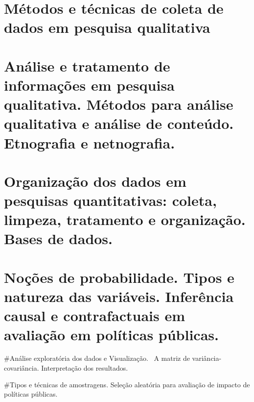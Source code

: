 \documentclass[
]{book}
\begin{document}
\hypertarget{muxe9todos-e-tuxe9cnicas-de-coleta-de-dados-em-pesquisa-qualitativa}{%
\chapter{Métodos e técnicas de coleta de dados em pesquisa qualitativa}\label{muxe9todos-e-tuxe9cnicas-de-coleta-de-dados-em-pesquisa-qualitativa}}

\hypertarget{anuxe1lise-e-tratamento-de-informauxe7uxf5es-em-pesquisa-qualitativa.-muxe9todos-para-anuxe1lise-qualitativa-e-anuxe1lise-de-conteuxfado.-etnografia-e-netnografia.}{%
\chapter{Análise e tratamento de informações em pesquisa qualitativa. Métodos para análise qualitativa e análise de conteúdo. Etnografia e netnografia.}\label{anuxe1lise-e-tratamento-de-informauxe7uxf5es-em-pesquisa-qualitativa.-muxe9todos-para-anuxe1lise-qualitativa-e-anuxe1lise-de-conteuxfado.-etnografia-e-netnografia.}}

\hypertarget{organizauxe7uxe3o-dos-dados-em-pesquisas-quantitativas-coleta-limpeza-tratamento-e-organizauxe7uxe3o.-bases-de-dados.}{%
\chapter{Organização dos dados em pesquisas quantitativas: coleta, limpeza, tratamento e organização. Bases de dados.}\label{organizauxe7uxe3o-dos-dados-em-pesquisas-quantitativas-coleta-limpeza-tratamento-e-organizauxe7uxe3o.-bases-de-dados.}}

\hypertarget{nouxe7uxf5es-de-probabilidade.-tipos-e-natureza-das-variuxe1veis.-inferuxeancia-causal-e-contrafactuais-em-avaliauxe7uxe3o-em-poluxedticas-puxfablicas.}{%
\chapter{Noções de probabilidade. Tipos e natureza das variáveis. Inferência causal e contrafactuais em avaliação em políticas públicas.}\label{nouxe7uxf5es-de-probabilidade.-tipos-e-natureza-das-variuxe1veis.-inferuxeancia-causal-e-contrafactuais-em-avaliauxe7uxe3o-em-poluxedticas-puxfablicas.}}

\#Análise exploratória dos dados e Visualização.~ A matriz de variância-covariância. Interpretação dos resultados.

\#Tipos e técnicas de amostragens. Seleção aleatória para avaliação de impacto de políticas públicas.
\end{document}

